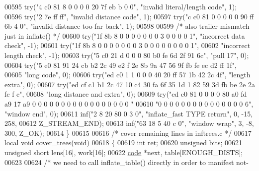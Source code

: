 \begin{DoxyCode}
{{{{{00595     \textcolor{keywordflow}{try}(\textcolor{stringliteral}{"4 c0 81 8 0 0 0 0 20 7f eb b 0 0"}, \textcolor{stringliteral}{"invalid literal/length code"}, 1);
00596     \textcolor{keywordflow}{try}(\textcolor{stringliteral}{"2 7e ff ff"}, \textcolor{stringliteral}{"invalid distance code"}, 1);
00597     \textcolor{keywordflow}{try}(\textcolor{stringliteral}{"c c0 81 0 0 0 0 0 90 ff 6b 4 0"}, \textcolor{stringliteral}{"invalid distance too far back"}, 1);
00598 
00599     \textcolor{comment}{/* also trailer mismatch just in inflate() */}
00600     \textcolor{keywordflow}{try}(\textcolor{stringliteral}{"1f 8b 8 0 0 0 0 0 0 0 3 0 0 0 0 1"}, \textcolor{stringliteral}{"incorrect data check"}, -1);
00601     \textcolor{keywordflow}{try}(\textcolor{stringliteral}{"1f 8b 8 0 0 0 0 0 0 0 3 0 0 0 0 0 0 0 0 1"},
00602         \textcolor{stringliteral}{"incorrect length check"}, -1);
00603     \textcolor{keywordflow}{try}(\textcolor{stringliteral}{"5 c0 21 d 0 0 0 80 b0 fe 6d 2f 91 6c"}, \textcolor{stringliteral}{"pull 17"}, 0);
00604     \textcolor{keywordflow}{try}(\textcolor{stringliteral}{"5 e0 81 91 24 cb b2 2c 49 e2 f 2e 8b 9a 47 56 9f fb fe ec d2 ff 1f"},
00605         \textcolor{stringliteral}{"long code"}, 0);
00606     \textcolor{keywordflow}{try}(\textcolor{stringliteral}{"ed c0 1 1 0 0 0 40 20 ff 57 1b 42 2c 4f"}, \textcolor{stringliteral}{"length extra"}, 0);
00607     \textcolor{keywordflow}{try}(\textcolor{stringliteral}{"ed cf c1 b1 2c 47 10 c4 30 fa 6f 35 1d 1 82 59 3d fb be 2e 2a fc f c"},
00608         \textcolor{stringliteral}{"long distance and extra"}, 0);
00609     \textcolor{keywordflow}{try}(\textcolor{stringliteral}{"ed c0 81 0 0 0 0 80 a0 fd a9 17 a9 0 0 0 0 0 0 0 0 0 0 0 0 0 0 0 0 0 "}
00610         \textcolor{stringliteral}{"0 0 0 0 0 0 0 0 0 0 0 0 0 0 0 6"}, \textcolor{stringliteral}{"window end"}, 0);
00611     inf(\textcolor{stringliteral}{"2 8 20 80 0 3 0"}, \textcolor{stringliteral}{"inflate\_fast TYPE return"}, 0, -15, 258,
00612         Z\_STREAM\_END);
00613     inf(\textcolor{stringliteral}{"63 18 5 40 c 0"}, \textcolor{stringliteral}{"window wrap"}, 3, -8, 300, Z\_OK);
00614 \}
00615 
00616 \textcolor{comment}{/* cover remaining lines in inftrees.c */}
00617 local \textcolor{keywordtype}{void} cover\_trees(\textcolor{keywordtype}{void})
00618 \{
00619     \textcolor{keywordtype}{int} ret;
00620     \textcolor{keywordtype}{unsigned} bits;
00621     \textcolor{keywordtype}{unsigned} \textcolor{keywordtype}{short} lens[16], work[16];
00622     \hyperlink{structcode}{code} *next, table[ENOUGH\_DISTS];
00623 
00624     \textcolor{comment}{/* we need to call inflate\_table() directly in order to manifest not-}
}}}}}
\end{DoxyCode}
